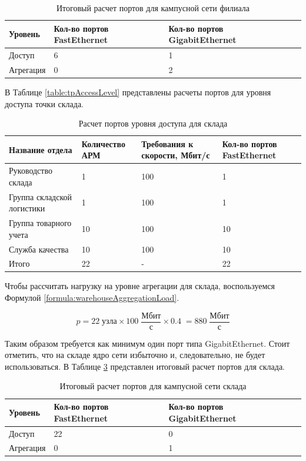 \documentclass[14pt, a4paper]{extarticle}
\numberwithin{equation}{section}
\begin{document}
\begin{table}[H]
\centering
\small
\caption{Итоговый расчет портов для кампусной сети филиала}
\label{table:filialCampusNet}
\begin{tabular}{|m{2cm}|m{4cm}|m{3cm}|m{3.5cm}|}
\hline
\textbf{Уровень} & \textbf{Кол-во портов FastEthernet} & \textbf{Кол-во портов GigabitEthernet} \\
\hline
Доступ & 6 & 1 \\
\hline
Агрегация & 0 & 2 \\
\hline
\end{tabular}
\end{table}


В Таблице \ref{table:tpAccessLevel} представлены расчеты портов для уровня доступа 
точки склада.

\begin{table}[H]
\centering
\small
\caption{Расчет портов уровня доступа для склада}
\label{table:warehouseAccessLevel}
\begin{tabular}{|m{3cm}|m{2.5cm}|m{2.5cm}|m{2.5cm}|}
\hline
\textbf{Название отдела} & \textbf{Количество АРМ} & \textbf{Требования к скорости, Мбит/с} & \textbf{Кол-во портов FastEthernet} \\
\hline
Руководство склада & 1 & 100 & 1 \\
\hline
Группа складской логистики & 1 & 100 & 1 \\
\hline
Группа товарного учета & 10 & 100 & 10 \\
\hline
Служба качества & 10 & 100 & 10 \\
\hline
Итого & 22 & - & 22 \\
\hline
\end{tabular}
\end{table}

Чтобы рассчитать нагрузку на уровне агрегации для 
склада, воспользуемся Формулой \ref{formula:warehouseAggregationLoad}.

\begin{equation}
p = 22 \; \text{узла} \times 100\;\frac{\text{Мбит}}{\text{с}} \times 0.4 \; = 880\;\frac{\text{Мбит}}{\text{с}}
\label{formula:warehouseAggregationLoad}
\end{equation}

Таким образом требуется как минимум один порт типа GigabitEthernet.
Стоит отметить, что на складе ядро сети избыточно и, 
следовательно, не будет использоваться.
В Таблице \ref{table:warehouseCampusNet} представлен итоговый расчет портов для склада.


\begin{table}[H]
\centering
\small
\caption{Итоговый расчет портов для кампусной сети склада}
\label{table:warehouseCampusNet}
\begin{tabular}{|m{2cm}|m{4cm}|m{3cm}|m{3.5cm}|}
\hline
\textbf{Уровень} & \textbf{Кол-во портов FastEthernet} & \textbf{Кол-во портов GigabitEthernet} \\
\hline
Доступ & 22 & 0 \\
\hline
Агрегация & 0 & 1 \\
\hline
\end{tabular}
\end{table}
\end{document}
